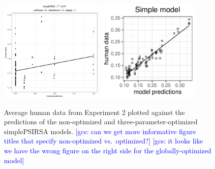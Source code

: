 \documentclass[10pt,a4paper]{article}
\newcommand{\gcs}[1]{\textcolor{blue}{[gcs: #1]}}
\begin{document}

\begin{figure}[ht]
	\centering
	\includegraphics[width=2in]{images/x3_m7.pdf}
	\includegraphics[width=2in]{images/x3_m11.pdf}
	\caption{Average human data from Experiment 2 plotted against the predictions of the non-optimized and three-parameter-optimized simplePSIRSA models. \gcs{can we get more informative figure titles that specify non-optimized vs.~optimized?} \gcs{it looks like we have the wrong figure on the right side for the globally-optimized model} }
	\label{simple-full-x3}
\end{figure}


\end{document}
